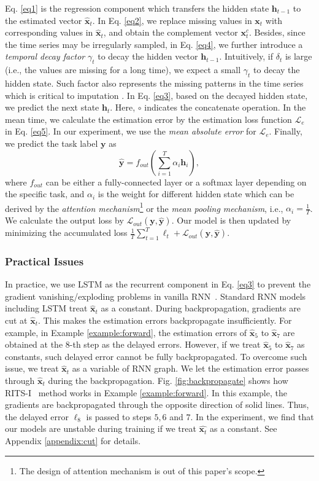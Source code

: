 \documentclass{article}
\newcommand{\ritsi}{\xspace{RITS-I}}
\newcommand{\x}{{\mathbf x}}
\newcommand{\y}{{\mathbf y}}
\newcommand{\h}{{\mathbf h}}
\begin{document}
Eq. \eqref{eq1} is the regression component which transfers the hidden state $\h_{t - 1}$ to the estimated vector $\hat{\x}_t$. In Eq. \eqref{eq2}, we replace missing values in $\x_t$ with corresponding values in $\hat{\x}_t$, and obtain the complement vector $\x_t^c$. Besides, since the time series may be irregularly sampled, in Eq. \eqref{eq4}, we further introduce a {\em temporal decay factor} $\gamma_t$ to decay the hidden vector $\h_{t - 1}$. Intuitively, if $\delta_t$ is large (i.e., the values are missing for a long time), we expect a small $\gamma_t$ to decay the hidden state.
Such factor also represents the missing patterns in the time series which is critical to imputation \cite{che2018recurrent}. In Eq. \eqref{eq3}, based on the decayed hidden state, we predict the next state $\h_t$. Here, 
$\circ$ indicates the concatenate operation.
In the mean time, we calculate the estimation error by the estimation loss function $\mathcal{L}_e$ in Eq. \eqref{eq5}. In our experiment, we use the {\em mean absolute error} for $\mathcal{L}_e$. Finally, we predict the task label $\y$ as
$$\hat{\y} = f_{out}(\sum_{i = 1}^T \alpha_i \h_i),$$ where $f_{out}$ can be either a fully-connected layer or a softmax layer depending on the specific task, and $\alpha_i$ is the weight for different hidden state which can be derived by the {\em attention mechanism}\footnote{The design of attention mechanism is out of this paper's scope.}  or the {\em mean pooling mechanism}, i.e., $\alpha_i = \frac{1}{T}$. We calculate the output loss by  $\mathcal{L}_{out}(\y, \hat{\y})$. Our model is then updated by minimizing the accumulated loss $\frac{1}{T}\sum_{t = 1}^T \ell_t + \mathcal{L}_{out}(\y, \hat{\y})$.

\subsubsection{Practical Issues}


In practice, we use LSTM as the recurrent component in Eq. \eqref{eq3} to prevent the gradient vanishing/exploding problems in vanilla RNN~\cite{DeepBook}. Standard RNN models including LSTM treat $\hat{\x}_t$  as a constant. During backpropagation, gradients are cut at $\hat{\x}_t$. This makes the estimation errors backpropagate insufficiently.
For example, in Example \ref{example:forward}, the estimation errors of $\hat{\x}_5$ to $\hat{\x}_7$ are obtained at the $8$-th step as the delayed errors. However, if we treat $\hat{\x}_5$ to $\hat{\x}_7$ as constants, such delayed error cannot be fully backpropagated. To overcome such issue, we treat $\hat{\x}_t$ as a variable of RNN graph. We let the estimation error passes through $\hat{\x}_t$ during the backpropagation.
Fig. \ref{fig:backpropagate} shows how \ritsi~ method works in Example \ref{example:forward}. In this example, the gradients are backpropagated through the opposite direction of solid lines. Thus, the delayed error $\ell_8$ is passed to steps $5, 6$ and $7$. In the experiment, we find that our models are unstable during training if we treat $\hat{\x_t}$ as a constant. 
See Appendix \ref{appendix:cut} for details.
\end{document}
